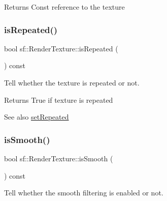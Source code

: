 \begin{DoxyReturn}{Returns}
Const reference to the texture \begin{DoxyVerb}\end{DoxyVerb}
 
\end{DoxyReturn}
\mbox{\label{classsf_1_1_render_texture_a81c5a453a21c7e78299b062b97dc8c87}} 
\subsubsection{\texorpdfstring{isRepeated()}{isRepeated()}}
{\footnotesize\ttfamily bool sf\+::\+Render\+Texture\+::is\+Repeated (\begin{DoxyParamCaption}{ }\end{DoxyParamCaption}) const}



Tell whether the texture is repeated or not. 

\begin{DoxyReturn}{Returns}
True if texture is repeated
\end{DoxyReturn}
\begin{DoxySeeAlso}{See also}
\mbox{\hyperlink{classsf_1_1_render_texture_af8f97b33512bf7d5b6be3da6f65f7365}{set\+Repeated}} \begin{DoxyVerb}\end{DoxyVerb}
 
\end{DoxySeeAlso}
\mbox{\label{classsf_1_1_render_texture_a5b43c007ab6643accc5dae84b5bc8f61}} 
\subsubsection{\texorpdfstring{isSmooth()}{isSmooth()}}
{\footnotesize\ttfamily bool sf\+::\+Render\+Texture\+::is\+Smooth (\begin{DoxyParamCaption}{ }\end{DoxyParamCaption}) const}



Tell whether the smooth filtering is enabled or not. 

